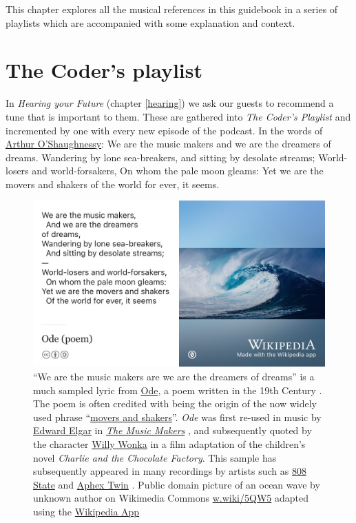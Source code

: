 \documentclass[
]{book}
\begin{document}
This chapter explores all the musical references in this guidebook in a series of playlists which are accompanied with some explanation and context.

\hypertarget{coders}{%
\section{The Coder's playlist}\label{coders}}

In \emph{Hearing your Future} (chapter \ref{hearing}) we ask our guests to recommend a tune that is important to them. These are gathered into \emph{The Coder's Playlist} and incremented by one with every new episode of the podcast. In the words of \href{https://en.wikipedia.org/wiki/Arthur_O\%27Shaughnessy}{Arthur O'Shaughnessy}: We are the music makers and we are the dreamers of dreams. Wandering by lone sea-breakers, and sitting by desolate streams; World-losers and world-forsakers, On whom the pale moon gleams: Yet we are the movers and shakers of the world for ever, it seems.

\begin{figure}
\includegraphics[width=0.99\linewidth]{images/we-are-the-music-makers} \caption{``We are the music makers are we are the dreamers of dreams'' is a much sampled lyric from \href{https://en.wikipedia.org/wiki/Ode_(poem)}{Ode}, a poem written in the 19th Century \citep{ode}. The poem is often credited with being the origin of the now widely used phrase ``\href{https://en.wikipedia.org/wiki/Movers_and_Shakers}{movers and shakers}''. \emph{Ode} was first re-used in music by \href{https://en.wikipedia.org/wiki/Edward_Elgar}{Edward Elgar} in \emph{\href{https://en.wikipedia.org/wiki/The_Music_Makers_(Elgar)}{The Music Makers}} \citep{themusicmakers}, and subsequently quoted by the character \href{https://en.wikipedia.org/wiki/Willy_Wonka}{Willy Wonka} in a film adaptation \citep{wonka} of the children's novel \emph{Charlie and the Chocolate Factory}. \citep{dahl} This sample has subsequently appeared in many recordings by artists such as \href{https://en.wikipedia.org/wiki/808_State}{808 State} \citep{nephatiti} and \href{https://en.wikipedia.org/wiki/Aphex_Twin}{Aphex Twin} \citep{aphextwin}. Public domain picture of an ocean wave by unknown author on Wikimedia Commons \href{https://w.wiki/5QW5}{w.wiki/5QW5} adapted using the \href{https://apps.apple.com/gb/app/wikipedia/id324715238}{Wikipedia App}}\label{fig:music-makers-fig}
\end{figure}
\end{document}
